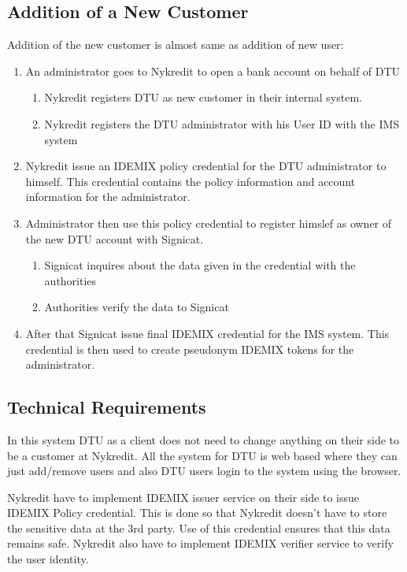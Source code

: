 \subsection{Addition of a New Customer}
Addition of the new customer is almost same as addition of new user:
\begin{enumerate}
	\item An administrator goes to Nykredit to open a bank account on behalf of DTU 
	\begin{enumerate}
		\item Nykredit registers DTU as new customer in their internal system.
		\item Nykredit registers the DTU administrator with his User ID with the IMS system
	\end{enumerate}
	\item Nykredit issue an IDEMIX policy credential for the  DTU administrator to himself. This credential contains the policy information and account information for the administrator.
	\item Administrator then use this policy credential to register himslef as owner of the new DTU account with Signicat. 
	\begin{enumerate}
		\item Signicat inquires about the data given in the credential with the authorities
		\item Authorities verify the data to Signicat
	\end{enumerate}
	\item After that Signicat issue final IDEMIX credential for the IMS system. This credential is then used to create pseudonym IDEMIX tokens for the administrator. 
\end{enumerate}
\subsection{Technical Requirements}
In this system DTU as a client does not need to change anything on their side to be a customer at Nykredit. All the system for DTU is web based where they can just add/remove users and also DTU users login to the system using the browser.

Nykredit have to implement IDEMIX issuer service on their side to issue IDEMIX Policy credential. This is done so that Nykredit doesn’t have to store the sensitive data at the 3rd party. Use of this credential ensures that this data remains safe. Nykredit also have to implement IDEMIX verifier service to verify the user identity.

